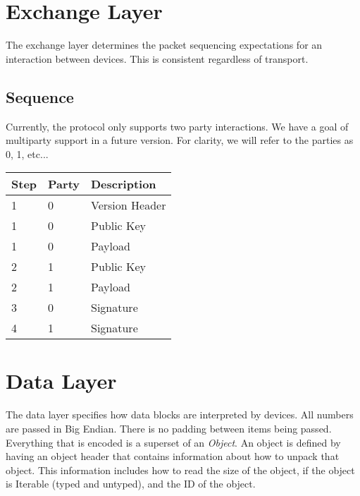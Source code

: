 \documentclass[11pt]{article}
\begin{document}
\section{Exchange Layer}
The exchange layer determines the packet sequencing expectations for an interaction
between devices.  This is consistent regardless of transport.

\subsection{Sequence}
Currently, the protocol only supports two party interactions. We have a goal of multiparty
support in a future version.  For clarity, we will refer to the parties as 0, 1, etc...

\begin{center}
  \begin{tabular}{ |l|l|l| }
    \hline
    \textbf{Step} & \textbf{Party} & \textbf{Description} \\
    \hline

    1             & 0              & Version Header       \\
    1             & 0              & Public Key           \\
    1             & 0              & Payload              \\
    2             & 1              & Public Key           \\
    2             & 1              & Payload              \\
    3             & 0              & Signature            \\
    4             & 1              & Signature            \\

    \hline
  \end{tabular}
\end{center}


\section{Data Layer}
The data layer specifies how data blocks are interpreted by devices. All numbers are passed in Big Endian.  There is no padding between items being passed. Everything that is encoded is a superset of an \textit{Object}. An object is defined by having an object header that contains information about how to unpack that object. This information includes how to read the size of the object, if the object is Iterable (typed and untyped), and the ID of the object.
\end{document}
